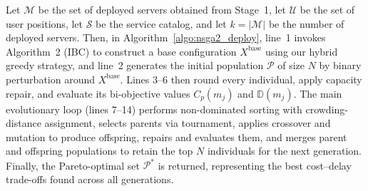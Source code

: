 \documentclass[10pt, conference, letterpaper]{IEEEtran}
\newenvironment{revision}{\begingroup\color{blue}}{\endgroup}
\newenvironment{revision}{\begingroup}{\endgroup}
\begin{document}

\begin{revision}
Let $\mathcal{M}$ be the set of deployed servers obtained from Stage~1, let $\mathcal{U}$ be the set of user positions, let $\mathcal{S}$ be the service catalog, and let $k=|\mathcal{M}|$ be the number of deployed servers.
\end{revision}
  Then, in Algorithm~\ref{algo:nsga2_deploy}, line~1 invokes Algorithm~2 (IBC) to construct a base configuration
  $X^{\text{base}}$ using our hybrid greedy strategy, and line~2 generates the initial population $\mathcal{P}$ of size
  $N$ by binary perturbation around $X^{\text{base}}$. Lines 3--6 then round every individual, apply capacity repair,
  and evaluate its bi-objective values $C_{p}(m_{j})$ and $\mathbb{D}(m_{j})$. The main evolutionary loop (lines 7--14)
  performs non-dominated sorting with crowding-distance assignment, selects parents via tournament, applies crossover
  and mutation to produce offspring, repairs and evaluates them, and merges parent and offspring populations to retain
  the top $N$ individuals for the next generation. Finally, the Pareto-optimal set $\mathcal{P}^{*}$ is returned,
  representing the best cost--delay trade-offs found across all generations.
\end{document}
